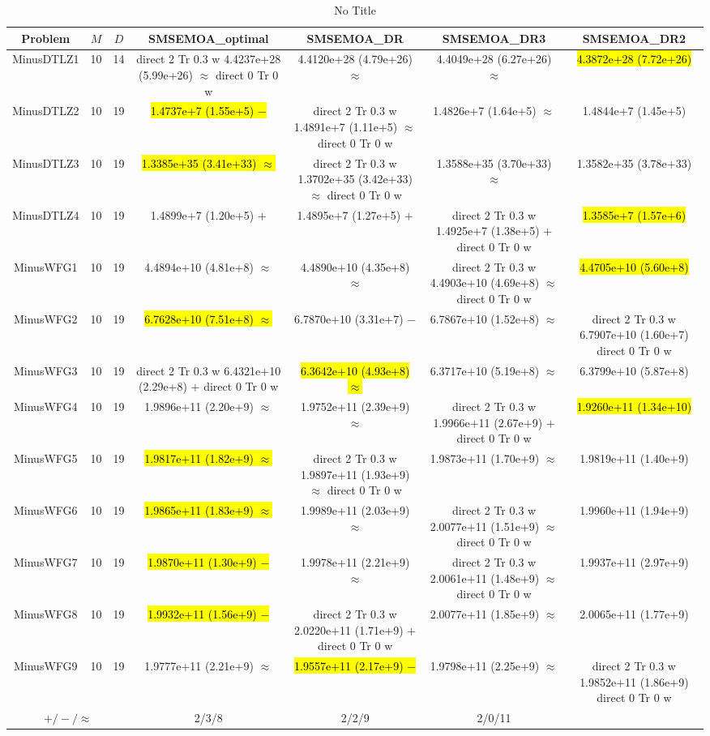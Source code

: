 \documentclass[journal]{IEEEtran}
\newcommand{\semitextbf}[1]{%
\pdfliteral direct {2 Tr 0.3 w} %
#1%
\pdfliteral direct {0 Tr 0 w}%
}
\begin{document}
\begin{table*}[htbp]
\renewcommand{\arraystretch}{1.2}
\centering
\caption{No Title}
\begin{tabular}{ccccccc}
\toprule
Problem&$M$&$D$&SMSEMOA\_optimal&SMSEMOA\_DR&SMSEMOA\_DR3&SMSEMOA\_DR2\\
\midrule
\multirow{1}{*}{MinusDTLZ1}&10&14&\semitextbf{4.4237e+28 (5.99e+26) $\approx$}&4.4120e+28 (4.79e+26) $\approx$&4.4049e+28 (6.27e+26) $\approx$&\hl{4.3872e+28 (7.72e+26)}\\
\hline
\multirow{1}{*}{MinusDTLZ2}&10&19&\hl{1.4737e+7 (1.55e+5) $-$}&\semitextbf{1.4891e+7 (1.11e+5) $\approx$}&1.4826e+7 (1.64e+5) $\approx$&1.4844e+7 (1.45e+5)\\
\hline
\multirow{1}{*}{MinusDTLZ3}&10&19&\hl{1.3385e+35 (3.41e+33) $\approx$}&\semitextbf{1.3702e+35 (3.42e+33) $\approx$}&1.3588e+35 (3.70e+33) $\approx$&1.3582e+35 (3.78e+33)\\
\hline
\multirow{1}{*}{MinusDTLZ4}&10&19&1.4899e+7 (1.20e+5) $+$&1.4895e+7 (1.27e+5) $+$&\semitextbf{1.4925e+7 (1.38e+5) $+$}&\hl{1.3585e+7 (1.57e+6)}\\
\hline
\multirow{1}{*}{MinusWFG1}&10&19&4.4894e+10 (4.81e+8) $\approx$&4.4890e+10 (4.35e+8) $\approx$&\semitextbf{4.4903e+10 (4.69e+8) $\approx$}&\hl{4.4705e+10 (5.60e+8)}\\
\hline
\multirow{1}{*}{MinusWFG2}&10&19&\hl{6.7628e+10 (7.51e+8) $\approx$}&6.7870e+10 (3.31e+7) $-$&6.7867e+10 (1.52e+8) $\approx$&\semitextbf{6.7907e+10 (1.60e+7)}\\
\hline
\multirow{1}{*}{MinusWFG3}&10&19&\semitextbf{6.4321e+10 (2.29e+8) $+$}&\hl{6.3642e+10 (4.93e+8) $\approx$}&6.3717e+10 (5.19e+8) $\approx$&6.3799e+10 (5.87e+8)\\
\hline
\multirow{1}{*}{MinusWFG4}&10&19&1.9896e+11 (2.20e+9) $\approx$&1.9752e+11 (2.39e+9) $\approx$&\semitextbf{1.9966e+11 (2.67e+9) $+$}&\hl{1.9260e+11 (1.34e+10)}\\
\hline
\multirow{1}{*}{MinusWFG5}&10&19&\hl{1.9817e+11 (1.82e+9) $\approx$}&\semitextbf{1.9897e+11 (1.93e+9) $\approx$}&1.9873e+11 (1.70e+9) $\approx$&1.9819e+11 (1.40e+9)\\
\hline
\multirow{1}{*}{MinusWFG6}&10&19&\hl{1.9865e+11 (1.83e+9) $\approx$}&1.9989e+11 (2.03e+9) $\approx$&\semitextbf{2.0077e+11 (1.51e+9) $\approx$}&1.9960e+11 (1.94e+9)\\
\hline
\multirow{1}{*}{MinusWFG7}&10&19&\hl{1.9870e+11 (1.30e+9) $-$}&1.9978e+11 (2.21e+9) $\approx$&\semitextbf{2.0061e+11 (1.48e+9) $\approx$}&1.9937e+11 (2.97e+9)\\
\hline
\multirow{1}{*}{MinusWFG8}&10&19&\hl{1.9932e+11 (1.56e+9) $-$}&\semitextbf{2.0220e+11 (1.71e+9) $+$}&2.0077e+11 (1.85e+9) $\approx$&2.0065e+11 (1.77e+9)\\
\hline
\multirow{1}{*}{MinusWFG9}&10&19&1.9777e+11 (2.21e+9) $\approx$&\hl{1.9557e+11 (2.17e+9) $-$}&1.9798e+11 (2.25e+9) $\approx$&\semitextbf{1.9852e+11 (1.86e+9)}\\
\hline
\multicolumn{3}{c}{$+/-/\approx$}&2/3/8&2/2/9&2/0/11&\\
\bottomrule
\end{tabular}
\label{No Label}
\end{table*}
\end{document}
